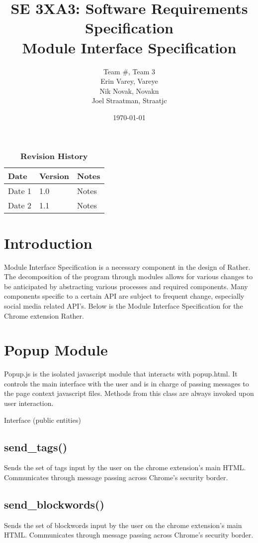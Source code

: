 \documentclass[12pt, titlepage]{article}
\title{SE 3XA3: Software Requirements Specification\\Module Interface Specification}
\author{Team \#, Team 3
		\\ Erin Varey, Vareye
		\\ Nik Novak, Novakn
		\\ Joel Straatman, Straatjc
}
\date{\today}
\begin{document}
\maketitle
{}
\tableofcontents
\listoftables
\begin{table}[bp]
\caption{\bf Revision History}
\begin{tabularx}{\textwidth}{p{3cm}p{2cm}X}
\toprule {\bf Date} & {\bf Version} & {\bf Notes}\\
\midrule
Date 1 & 1.0 & Notes\\
Date 2 & 1.1 & Notes\\
\bottomrule
\end{tabularx}
\end{table}
\newpage
{}
\section{Introduction}
Module Interface Specification is a necessary component in the design of Rather. The decomposition of the program through modules allows for various changes to be anticipated by abstracting various processes and required components. Many components specific to a certain API are subject to frequent change, especially social media related API's. Below is the Module Interface Specification for the Chrome extension Rather.

\section{Popup Module}
Popup.js is the isolated javascript module that interacts with popup.html. It controls the main interface with the user and is in charge of passing messages to the page context javascript files. Methods from this class are always invoked upon user interaction.

Interface (public entities)
\subsection{send\_tags()}
Sends the set of tags input by the user on the chrome extension’s main HTML. Communicates through message passing across Chrome’s %
security border. 
\subsection{send\_blockwords()}
Sends the set of blockwords input by the user on the chrome extension’s main HTML. Communicates through message passing across Chrome’s %
security border.
\end{document}

